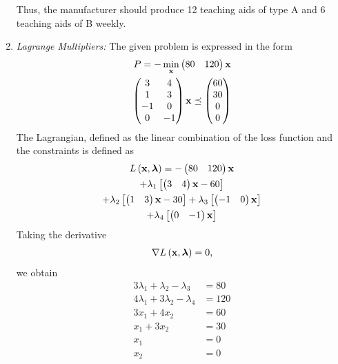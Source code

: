 \documentclass[journal,12pt,twocolumn]{IEEEtran}
\begin{document}
\begin{enumerate}
              Thus, the manufacturer should produce 12 teaching aids of type A and 6 teaching aids of B weekly.
        \item {\em Lagrange Multipliers: } The given problem is expressed in the form
              \begin{align}
                  P = -\min_{\mathbf{x}}\begin{pmatrix}80 & 120\end{pmatrix}\mathbf{x}
                  \\
                  \begin{pmatrix}3                     & 4           \\ 1 & 3 \\ -1 & 0 \\ 0 & -1\end{pmatrix} \mathbf{x}\preceq \begin{pmatrix}60 \\ 30 \\0 \\ 0\end{pmatrix}
              \end{align}
              The Lagrangian, defined as the linear combination of the loss function and the constraints is defined as
              \begin{multline}
                  L\left(\mathbf{x},\bm{\lambda}\right) =-\begin{pmatrix}80 & 120\end{pmatrix}\mathbf{x}
                  \\
                  + \lambda_1{}\left[\begin{pmatrix}3 & 4\end{pmatrix}\mathbf{x}-60\right]
                  \\
                  +
                  \lambda_2{}\left[\begin{pmatrix}1 & 3\end{pmatrix}\mathbf{x}-30\right]+
                  \lambda_3{}\left[\begin{pmatrix}-1 & 0\end{pmatrix}\mathbf{x}\right]
                  \\
                  +
                  \lambda_4{}\left[\begin{pmatrix}0 & -1\end{pmatrix}\mathbf{x}\right]
              \end{multline}
              Taking the derivative
              \begin{align}
                  {\nabla L\ensuremath{\left(\mathbf{x},\bm{\lambda}\right)}} = 0,
              \end{align}
              we obtain
              \begin{align}
                  3\lambda_1 + \lambda_2 -\lambda_3  & = 80
                  \\
                  4\lambda_1 + 3\lambda_2 -\lambda_4 & = 120
                  \\
                  3x_1 + 4x_2                        & = 60
                  \\
                  x_1 + 3x_2                         & = 30
                  \\
                  x_1                                & = 0
                  \\
                  x_2                                & = 0

\end{align}
\end{enumerate}
\end{document}
